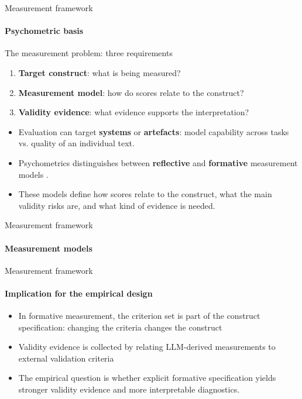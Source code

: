 \begin{frame}{Measurement framework}
\framesubtitle{Psychometric basis}

\begin{block}{The measurement problem: three requirements}
\begin{enumerate}
    \item \textbf{Target construct}: what is being measured?
    \item \textbf{Measurement model}: how do scores relate to the construct?
    \item \textbf{Validity evidence}: what evidence supports the interpretation?
\end{enumerate}
\end{block}

\vspace{0.3cm}

\begin{itemize}
    \item Evaluation can target \textbf{systems} or \textbf{artefacts}: model capability across tasks vs. quality of an individual text.

    \item Psychometrics distinguishes between \textbf{reflective} and \textbf{formative} measurement models \citep{bollen1991conventional}.

    \item These models define how scores relate to the construct, what the main validity risks are, and what kind of evidence is needed.
\end{itemize}

\end{frame}




\begin{frame}{Measurement framework}
\framesubtitle{Measurement models}

\centering
\resizebox{0.95\textwidth}{!}{%
    
}


\end{frame}


\begin{frame}{Measurement framework}
\framesubtitle{Implication for the empirical design}

\begin{itemize}
    \item In formative measurement, the criterion set is part of the construct specification: changing the criteria changes the construct \citep{bollen1991conventional}

    \item Validity evidence is collected by relating LLM-derived measurements to external validation criteria

    \item The empirical question is whether explicit formative specification yields stronger validity evidence and more interpretable diagnostics.
\end{itemize}

\end{frame}